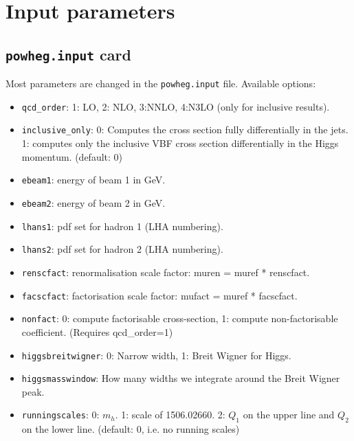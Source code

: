 \documentclass[12pt,a4]{article}
\begin{document}
\section{Input parameters}
\subsection{\texttt{powheg.input} card}
Most parameters are changed in the \texttt{powheg.input} file.
%
Available options:
\begin{itemize}
\item \texttt{qcd\_order}: 1: LO, 2: NLO, 3:NNLO, 4:N3LO (only for
  inclusive results).

\item \texttt{inclusive\_only}: 0: Computes the cross section fully
  differentially in the jets. 1: computes only the inclusive VBF cross
  section differentially in the Higgs momentum. (default: 0)

\item\texttt{ebeam1}: energy of beam 1 in GeV.
  
\item\texttt{ebeam2}: energy of beam 2 in GeV.

\item\texttt{lhans1}: pdf set for hadron 1 (LHA numbering).

\item\texttt{lhans2}: pdf set for hadron 2 (LHA numbering).

\item\texttt{renscfact}: renormalisation scale factor: muren = muref *
  renscfact.
  
\item\texttt{facscfact}: factorisation scale factor: mufact = muref *
  facscfact.
  
\item\texttt{nonfact}: 0: compute factorisable cross-section, 1: compute
  non-factorisable coefficient. (Requires qcd\_order=1)
  
\item\texttt{higgsbreitwigner}: 0: Narrow width, 1: Breit Wigner for Higgs.
  
\item\texttt{higgsmasswindow}: How many widths we integrate around the
  Breit Wigner peak.
  
\item\texttt{runningscales}: 0: $m_h$. 1: scale of 1506.02660. 2: $Q_1$
  on the upper line and $Q_2$ on the lower line. (default: 0, i.e. no
  running scales)
                  

\end{itemize}
\end{document}
